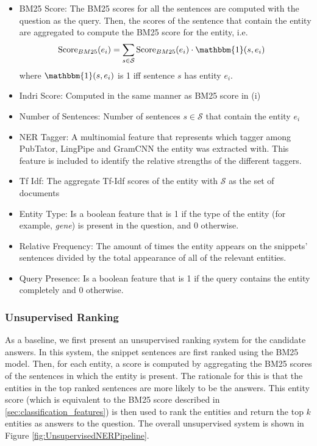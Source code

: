 \begin{itemize}[noitemsep]
    \item BM25 Score: The BM25 scores for all the sentences are computed with the question as the query. Then, the scores of the sentence that contain the entity are aggregated to compute the BM25 score for the entity, i.e.
    \begin{align*}
        \text{Score}_{BM25}(e_i) &= \sum_{s \in \mathcal{S}} \text{Score}_{BM25}(e_i) \cdot \mathbbm{1}(s, e_i)
    \end{align*}
    where $\mathbbm{1}(s, e_i)$ is 1 iff sentence $s$ has entity $e_i$.
    \item Indri Score: Computed in the same manner as BM25 score in (i)
    \item Number of Sentences: Number of sentences $s \in \mathcal{S}$ that contain the entity $e_i$
    \item NER Tagger: A multinomial feature that represents which tagger among PubTator, LingPipe and GramCNN the entity was extracted with. This feature is included to identify the relative strengths of the different taggers.
    \item Tf Idf: The aggregate Tf-Idf scores of the entity with $\mathcal{S}$ as the set of documents
    \item Entity Type: Is a boolean feature that is 1 if the type of the entity (for example, \textit{gene}) is present in the question, and 0 otherwise.
    \item Relative Frequency: The amount of times the entity appears on the snippets' sentences divided by the total appearance of all of the relevant entities.
    \item Query Presence: Is a boolean feature that is 1 if the query contains the entity completely and 0 otherwise.

\end{itemize}

\subsubsection{Unsupervised Ranking}

As a baseline, we first present an unsupervised ranking system for the candidate answers. In this system, the snippet sentences are first ranked using the BM25 model. Then, for each entity, a score is computed by aggregating the BM25 scores of the sentences in which the entity is present. The rationale for this is that the entities in the top ranked sentences are more likely to be the answers. This entity score (which is equivalent to the BM25 score described in \ref{sec:classification_features}) is then used to rank the entities and return the top $k$ entities as answers to the question. The overall unsupervised system is shown in Figure \ref{fig:UnsupervisedNERPipeline}.

